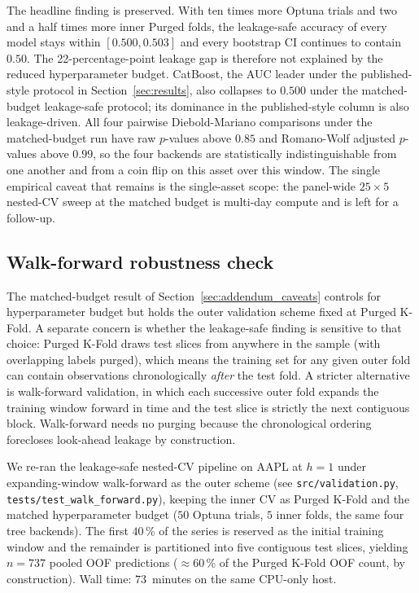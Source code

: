 \documentclass{rQUF2e}
\begin{document}
\noindent The headline finding is preserved. With ten times
more Optuna trials and two and a half times more inner Purged
folds, the leakage-safe accuracy of every model stays within
$[0.500, 0.503]$ and every bootstrap CI continues to contain
$0.50$. The 22-percentage-point leakage gap is therefore not
explained by the reduced hyperparameter budget. CatBoost, the
AUC leader under the published-style protocol in
Section~\ref{sec:results}, also collapses to $0.500$ under the
matched-budget leakage-safe protocol; its dominance in the
published-style column is also leakage-driven. All four pairwise
Diebold-Mariano comparisons under the matched-budget run have
raw $p$-values above $0.85$ and Romano-Wolf adjusted $p$-values
above $0.99$, so the four backends are statistically
indistinguishable from one another and from a coin flip on
this asset over this window. The single empirical caveat that
remains is the single-asset scope: the panel-wide $25 \times 5$
nested-CV sweep at the matched budget is multi-day compute and
is left for a follow-up.

\subsection{Walk-forward robustness check}
\label{sec:addendum_walkforward}

The matched-budget result of
Section~\ref{sec:addendum_caveats} controls for hyperparameter
budget but holds the outer validation scheme fixed at Purged
K-Fold. A separate concern is whether the leakage-safe finding
is sensitive to that choice: Purged K-Fold draws test slices
from anywhere in the sample (with overlapping labels purged),
which means the training set for any given outer fold can
contain observations chronologically \emph{after} the test
fold. A stricter alternative is walk-forward validation, in
which each successive outer fold expands the training window
forward in time and the test slice is strictly the next
contiguous block. Walk-forward needs no purging because the
chronological ordering forecloses look-ahead leakage by
construction.

We re-ran the leakage-safe nested-CV pipeline on AAPL at $h=1$
under expanding-window walk-forward as the outer scheme (see
\texttt{src/validation.py}, \texttt{tests/test\_walk\_forward.py}),
keeping the inner CV as Purged K-Fold and the matched
hyperparameter budget ($50$ Optuna trials, $5$ inner folds, the
same four tree backends). The first $40$\,\% of the series is
reserved as the initial training window and the remainder is
partitioned into five contiguous test slices, yielding
$n=737$ pooled OOF predictions ($\approx 60$\,\% of the Purged
K-Fold OOF count, by construction). Wall time:
$73$~minutes on the same CPU-only host.
\end{document}
